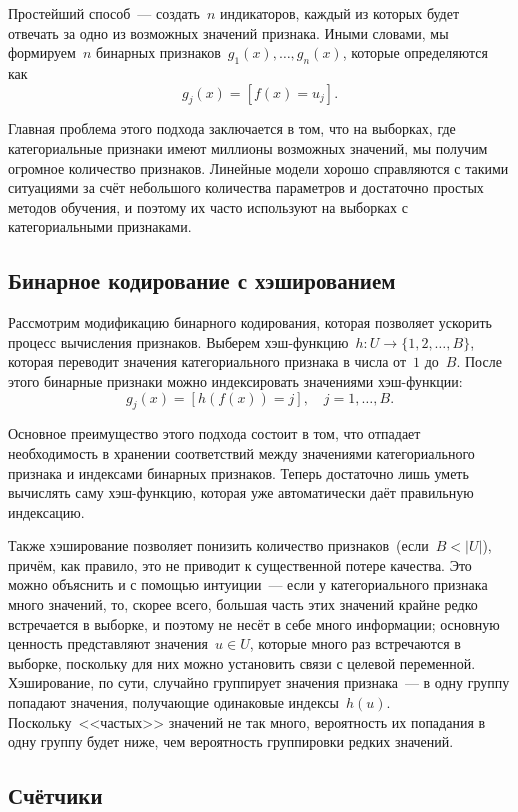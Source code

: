 \documentclass[12pt,fleqn]{article}
\begin{document}
Простейший способ~--- создать~$n$ индикаторов, каждый из которых будет отвечать
за одно из возможных значений признака.
Иными словами, мы формируем~$n$ бинарных признаков~$g_1(x), \dots, g_n(x)$,
которые определяются как
\[
    g_j(x) = [f(x) = u_j].
\]

Главная проблема этого подхода заключается в том, что на выборках,
где категориальные признаки имеют миллионы возможных значений,
мы получим огромное количество признаков.
Линейные модели хорошо справляются с такими ситуациями за счёт небольшого количества
параметров и достаточно простых методов обучения, и поэтому их часто
используют на выборках с категориальными признаками.

\subsection{Бинарное кодирование с хэшированием}

Рассмотрим модификацию бинарного кодирования, которая позволяет ускорить процесс вычисления признаков.
Выберем хэш-функцию~$h: U \to \{1, 2, \dots, B\}$, которая переводит значения категориального признака
в числа от~$1$ до~$B$.
После этого бинарные признаки можно индексировать значениями хэш-функции:
\[
    g_j(x) = [h(f(x)) = j],
    \quad
    j = 1, \dots, B.
\]

Основное преимущество этого подхода состоит в том, что отпадает необходимость
в хранении соответствий между значениями категориального признака и индексами бинарных признаков.
Теперь достаточно лишь уметь вычислять саму хэш-функцию, которая уже автоматически даёт правильную индексацию.

Также хэширование позволяет понизить количество признаков~(если~$B < |U|$),
причём, как правило, это не приводит к существенной потере качества.
Это можно объяснить и с помощью интуиции~--- если у категориального признака много значений,
то, скорее всего, большая часть этих значений крайне редко встречается в выборке, и поэтому
не несёт в себе много информации;
основную ценность представляют значения~$u \in U$, которые много раз встречаются в выборке,
поскольку для них можно установить связи с целевой переменной.
Хэширование, по сути, случайно группирует значения признака~--- в одну группу попадают
значения, получающие одинаковые индексы~$h(u)$.
Поскольку~<<частых>> значений не так много, вероятность их попадания в одну группу
будет ниже, чем вероятность группировки редких значений.

\subsection{Счётчики}
\end{document}
